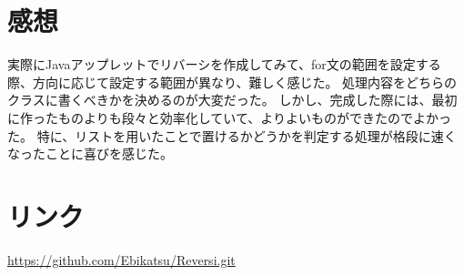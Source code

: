 \documentclass[10.5pt, a4paper]{jsarticle}
\begin{document}
\section{感想}
実際にJavaアップレットでリバーシを作成してみて、for文の範囲を設定する際、方向に応じて設定する範囲が異なり、難しく感じた。
処理内容をどちらのクラスに書くべきかを決めるのが大変だった。
しかし、完成した際には、最初に作ったものよりも段々と効率化していて、よりよいものができたのでよかった。
特に、リストを用いたことで置けるかどうかを判定する処理が格段に速くなったことに喜びを感じた。

\section{リンク}
\url{https://github.com/Ebikatsu/Reversi.git}
\end{document}
